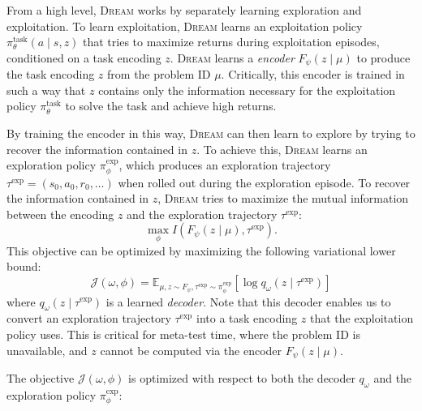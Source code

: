\documentclass[12pt]{article}
\newcommand{\dream}{\textsc{Dream }}
\begin{document}
From a high level, \dream works by separately learning exploration and exploitation.
To learn exploitation, \dream learns an exploitation policy $\pi_\theta^\text{task}(a \mid s, z)$ that tries to maximize returns during exploitation episodes, conditioned on a task encoding $z$.
\dream learns a \emph{encoder} $F_\psi(z \mid \mu)$ to produce the task encoding $z$ from the problem ID $\mu$.
Critically, this encoder is trained in such a way that $z$ contains only the information necessary for the exploitation policy $\pi_\theta^\text{task}$ to solve the task and achieve high returns.

By training the encoder in this way, \dream can then learn to explore by trying to recover the information contained in $z$.
To achieve this, \dream learns an exploration policy $\pi_\phi^\text{exp}$, which produces an exploration trajectory $\tau^\text{exp} = (s_0, a_0, r_0, \ldots)$ when rolled out during the exploration episode.
To recover the information contained in $z$, \dream tries to maximize the mutual information between the encoding $z$ and the exploration trajectory $\tau^\text{exp}$:
$$\max_{\phi}I(F_{\psi}(z \mid \mu), \tau^\text{exp}).$$
%
This objective can be optimized by maximizing the following variational lower bound:
%
\begin{equation*}
    \mathcal{J(\omega, \phi)} = \mathbb{E}_{\mu, z\sim F_{\psi},\tau^\text{exp} \sim \pi_\phi^\text{exp}}[\log q_{\omega}(z \mid \tau^\text{exp})]
\end{equation*}
%
where $q_{\omega}(z \mid \tau^\text{exp})$ is a learned \emph{decoder}.
Note that this decoder enables us to convert an exploration trajectory $\tau^\text{exp}$ into a task encoding $z$ that the exploitation policy uses.
This is critical for meta-test time, where the problem ID is unavailable, and $z$ cannot be computed via the encoder $F_\psi(z \mid \mu)$.

The objective $\mathcal{J}(\omega, \phi)$ is optimized with respect to both the decoder $q_\omega$ and the exploration policy $\pi_\phi^\text{exp}$:
\end{document}
